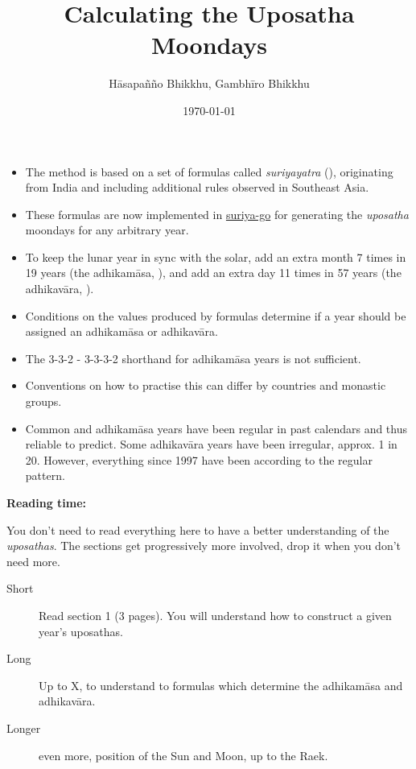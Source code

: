 \documentclass[11pt,oneside]{memoir-article}
\author{Hāsapañño Bhikkhu, Gambhīro Bhikkhu}
\date{\today}
\title{Calculating the Uposatha Moondays}
\begin{document}
\maketitle
\begin{tldr}
\begin{itemize}
\item The method is based on a set of formulas called \emph{suriyayatra} (),
originating from India and including additional rules observed in Southeast
Asia.
\item These formulas are now implemented in \href{https://github.com/splendidmoons/suriya-go}{suriya-go} for generating the \emph{uposatha}
  moondays for any arbitrary year.
\item To keep the lunar year in sync with the solar, add an extra month 7 times in
19 years (the adhikamāsa, ), and add an extra day 11 times in 57
years (the adhikavāra, ).
\item Conditions on the values produced by formulas determine if a year should be
assigned an adhikamāsa or adhikavāra.
\item The 3-3-2 - 3-3-3-2 shorthand for adhikamāsa years is not sufficient.
\item Conventions on how to practise this can differ by countries and monastic groups.
\item Common and adhikamāsa years have been regular in past calendars and thus
reliable to predict. Some adhikavāra years have been irregular, approx. 1
in 20. However, everything since 1997 have been according to the regular
pattern.
\end{itemize}
\end{tldr}

\thispagestyle{empty}


{\centering\large\bfseries
Reading time:
\par}

You don't need to read everything here to have a better understanding of the
\emph{uposathas}. The sections get progressively more involved, drop it when you
don't need more.

\begin{description}
\item[{Short}] Read section 1 (3 pages). You will understand how to construct a given year's uposathas.
\item[{Long}] Up to X, to understand to formulas which determine the adhikamāsa and adhikavāra.
\item[{Longer}] even more, position of the Sun and Moon, up to the Raek.
\end{description}
\end{document}
